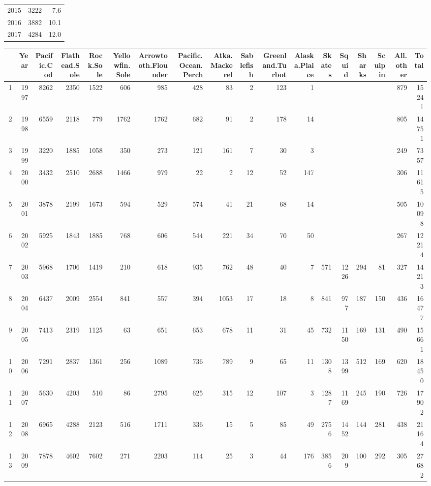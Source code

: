 \documentclass[]{article}
\begin{document}
\begin{table}[ht]
\begin{tabular}{rrr}
  2015 & 3222 & 7.6 \\ 
  2016 & 3882 & 10.1 \\ 
  2017 & 4284 & 12.0 \\ 
   \hline
\end{tabular}
\end{table}\begin{table}[ht]
\centering
\begin{tabular}{rrrrrrrrrrrrrrrrrr}
  \hline
 & Year & Pacific.Cod & Flathead.Sole & Rock.Sole & Yellowfin.Sole & Arrowtooth.Flounder & Pacific.Ocean.Perch & Atka.Mackerel & Sablefish & Greenland.Turbot & Alaska.Plaice & Skates & Squid & Sharks & Sculpin & All.other & Total \\ 
  \hline
1 & 1997 & 8262 & 2350 & 1522 & 606 & 985 & 428 &  83 &   2 & 123 &   1 &  &  &  &  & 879 & 15241 \\ 
  2 & 1998 & 6559 & 2118 & 779 & 1762 & 1762 & 682 &  91 &   2 & 178 &  14 &  &  &  &  & 805 & 14751 \\ 
  3 & 1999 & 3220 & 1885 & 1058 & 350 & 273 & 121 & 161 &   7 &  30 &   3 &  &  &  &  & 249 & 7357 \\ 
  4 & 2000 & 3432 & 2510 & 2688 & 1466 & 979 &  22 &   2 &  12 &  52 & 147 &  &  &  &  & 306 & 11615 \\ 
  5 & 2001 & 3878 & 2199 & 1673 & 594 & 529 & 574 &  41 &  21 &  68 &  14 &  &  &  &  & 505 & 10098 \\ 
  6 & 2002 & 5925 & 1843 & 1885 & 768 & 606 & 544 & 221 &  34 &  70 &  50 &  &  &  &  & 267 & 12214 \\ 
  7 & 2003 & 5968 & 1706 & 1419 & 210 & 618 & 935 & 762 &  48 &  40 &   7 & 571 & 1226 & 294 &  81 & 327 & 14213 \\ 
  8 & 2004 & 6437 & 2009 & 2554 & 841 & 557 & 394 & 1053 &  17 &  18 &   8 & 841 & 977 & 187 & 150 & 436 & 16477 \\ 
  9 & 2005 & 7413 & 2319 & 1125 &  63 & 651 & 653 & 678 &  11 &  31 &  45 & 732 & 1150 & 169 & 131 & 490 & 15661 \\ 
  10 & 2006 & 7291 & 2837 & 1361 & 256 & 1089 & 736 & 789 &   9 &  65 &  11 & 1308 & 1399 & 512 & 169 & 620 & 18450 \\ 
  11 & 2007 & 5630 & 4203 & 510 &  86 & 2795 & 625 & 315 &  12 & 107 &   3 & 1287 & 1169 & 245 & 190 & 726 & 17902 \\ 
  12 & 2008 & 6965 & 4288 & 2123 & 516 & 1711 & 336 &  15 &   5 &  85 &  49 & 2756 & 1452 & 144 & 281 & 438 & 21164 \\ 
  13 & 2009 & 7878 & 4602 & 7602 & 271 & 2203 & 114 &  25 &   3 &  44 & 176 & 3856 & 209 & 100 & 292 & 305 & 27682 \\ 

\end{tabular}
\end{table}
\end{document}

